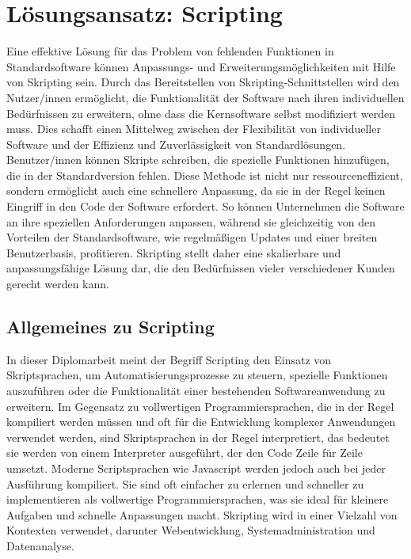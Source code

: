 \newpage
\section{Lösungsansatz: Scripting}

Eine effektive Lösung für das Problem von fehlenden Funktionen in Standardsoftware 
können Anpassungs- und Erweiterungsmöglichkeiten mit Hilfe von Skripting sein. 
Durch das Bereitstellen von Skripting-Schnittstellen wird den 
Nutzer/innen ermöglicht, die Funktionalität der Software nach ihren individuellen Bedürfnissen 
zu erweitern, ohne dass die Kernsoftware selbst modifiziert werden muss. 
Dies schafft einen Mittelweg zwischen der Flexibilität von individueller Software 
und der Effizienz und Zuverlässigkeit von Standardlösungen. Benutzer/innen können 
Skripte schreiben, die spezielle Funktionen hinzufügen, die in der Standardversion fehlen. 
Diese Methode ist nicht nur ressourceneffizient, sondern ermöglicht auch eine schnellere 
Anpassung, da sie in der Regel keinen Eingriff in den Code der Software erfordert. 
So können Unternehmen die Software an ihre speziellen Anforderungen anpassen, 
während sie gleichzeitig von den Vorteilen der Standardsoftware, wie regelmäßigen 
Updates und einer breiten Benutzerbasis, profitieren. Skripting stellt daher eine 
skalierbare und anpassungsfähige Lösung dar, die den Bedürfnissen vieler verschiedener 
Kunden gerecht werden kann.

\subsection*{Allgemeines zu Scripting}

In dieser Diplomarbeit meint der Begriff Scripting den Einsatz von Skriptsprachen, 
um Automatisierungsprozesse zu steuern, spezielle Funktionen auszuführen oder die 
Funktionalität einer bestehenden Softwareanwendung zu erweitern. 
Im Gegensatz zu vollwertigen Programmiersprachen, die in der Regel kompiliert werden 
müssen und oft für die Entwicklung komplexer Anwendungen verwendet werden, 
sind Skriptsprachen in der Regel interpretiert, das bedeutet sie werden von einem 
Interpreter ausgeführt, der den Code Zeile für Zeile umsetzt. Moderne Scriptsprachen wie 
Javascript werden jedoch auch bei jeder Ausführung kompiliert.
Sie sind oft einfacher zu 
erlernen und schneller zu implementieren als vollwertige Programmiersprachen, was sie ideal 
für kleinere Aufgaben und schnelle Anpassungen macht. Skripting wird in einer Vielzahl von 
Kontexten verwendet, darunter Webentwicklung, Systemadministration und Datenanalyse.

